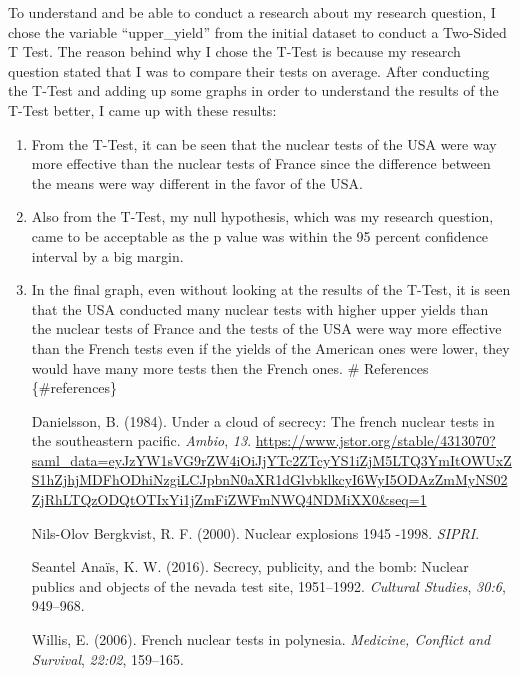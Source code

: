 \documentclass[
  12pt,
]{article}
\newlength{\cslhangindent}
\newlength{\cslentryspacingunit} %
\newenvironment{CSLReferences}[2] %
 {%
  \setlength{\parindent}{0pt}
  \ifodd #1
  \let\oldpar\par
  \def\par{\hangindent=\cslhangindent\oldpar}
  \fi
  \setlength{\parskip}{#2\cslentryspacingunit}
 }%
 {}
\begin{document}
To understand and be able to conduct a research about my research question, I chose the variable ``upper\_yield'' from the initial dataset to conduct a Two-Sided T Test. The reason behind why I chose the T-Test is because my research question stated that I was to compare their tests on average. After conducting the T-Test and adding up some graphs in order to understand the results of the T-Test better, I came up with these results:

\begin{enumerate}
\def\labelenumi{\arabic{enumi}.}
\item
  From the T-Test, it can be seen that the nuclear tests of the USA were way more effective than the nuclear tests of France since the difference between the means were way different in the favor of the USA.
\item
  Also from the T-Test, my null hypothesis, which was my research question, came to be acceptable as the p value was within the 95 percent confidence interval by a big margin.
\item
  In the final graph, even without looking at the results of the T-Test, it is seen that the USA conducted many nuclear tests with higher upper yields than the nuclear tests of France and the tests of the USA were way more effective than the French tests even if the yields of the American ones were lower, they would have many more tests then the French ones.
  \newpage
  \# References \{\#references\}

  \hypertarget{refs}{}
  \begin{CSLReferences}{1}{0}
  \leavevmode{}%
  Danielsson, B. (1984). Under a cloud of secrecy: The french nuclear tests in the southeastern pacific. \emph{Ambio}, \emph{13}. \url{https://www.jstor.org/stable/4313070?saml_data=eyJzYW1sVG9rZW4iOiJjYTc2ZTcyYS1iZjM5LTQ3YmItOWUxZS1hZjhjMDFhODhiNzgiLCJpbnN0aXR1dGlvbklkcyI6WyI5ODAzZmMyNS02ZjRhLTQzODQtOTIxYi1jZmFiZWFmNWQ4NDMiXX0\&seq=1}

  \leavevmode{}%
  Nils-Olov Bergkvist, R. F. (2000). Nuclear explosions 1945 -1998. \emph{SIPRI}.

  \leavevmode{}%
  Seantel Anaïs, K. W. (2016). Secrecy, publicity, and the bomb: Nuclear publics and objects of the nevada test site, 1951--1992. \emph{Cultural Studies}, \emph{30:6}, 949--968.

  \leavevmode{}%
  Willis, E. (2006). French nuclear tests in polynesia. \emph{Medicine, Conflict and Survival}, \emph{22:02}, 159--165.

  \end{CSLReferences}
\end{enumerate}
\end{document}
